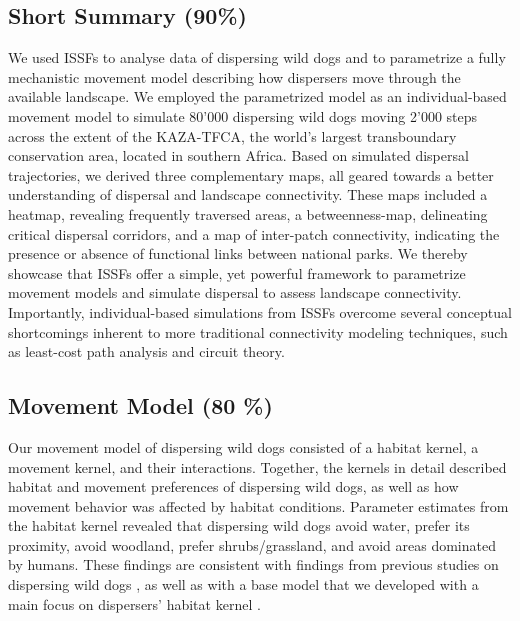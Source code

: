 \documentclass[abstract=on,10pt,a4paper,bibliography=totocnumbered]{article}
\begin{document}
\subsection{Short Summary (90\%)}
We used ISSFs to analyse data of dispersing wild dogs and to parametrize a fully
mechanistic movement model describing how dispersers move through the available
landscape. We employed the parametrized model as an individual-based movement
model to simulate 80'000 dispersing wild dogs moving 2'000 steps across the
extent of the KAZA-TFCA, the world's largest transboundary conservation area,
located in southern Africa. Based on simulated dispersal trajectories, we
derived three complementary maps, all geared towards a better understanding of
dispersal and landscape connectivity. These maps included a heatmap, revealing
frequently traversed areas, a betweenness-map, delineating critical dispersal
corridors, and a map of inter-patch connectivity, indicating the presence or
absence of functional links between national parks. We thereby showcase that
ISSFs offer a simple, yet powerful framework to parametrize movement models and
simulate dispersal to assess landscape connectivity. Importantly,
individual-based simulations from ISSFs overcome several conceptual shortcomings
inherent to more traditional connectivity modeling techniques, such as
least-cost path analysis and circuit theory.

\subsection{Movement Model (80 \%)}
Our movement model of dispersing wild dogs consisted of a habitat kernel, a
movement kernel, and their interactions. Together, the kernels in detail
described habitat and movement preferences of dispersing wild dogs, as well as
how movement behavior was affected by habitat conditions. Parameter estimates
from the habitat kernel revealed that dispersing wild dogs avoid water, prefer
its proximity, avoid woodland, prefer shrubs/grassland, and avoid areas
dominated by humans. These findings are consistent with findings from previous
studies on dispersing wild dogs \citep{DaviesMostert.2012, Masenga.2016,
Woodroffe.2019, Oneill.2020}, as well as with a base model that we developed
with a main focus on dispersers' habitat kernel \citep{Hofmann.2021}.
\end{document}
